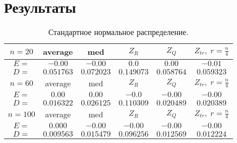 \documentclass[a4]{article}
\begin{document}
\newpage
\section{Результаты}

\begin{table}[H]
\caption{\label{tab:normal} Стандартное нормальное распределение.}
\begin{center}
\begin{tabular}{|c|c|c|c|c|c|}
\hline
$n = 20$ & average & med & $Z_R$ & $Z_Q$ & $Z_{tr},\;r=\frac{n}{4}$\\
\hline
$E =$ & $-0.00$ & $-0.00$ & $0.0$ & $0.00$ & $-0.01$\\
\hline
$D =$ & $0.051763$ & $0.072023$ & $0.149073$ & $0.058764$ & $0.059323$\\
\hline
$n = 60$ & average & med & $Z_R$ & $Z_Q$ & $Z_{tr},\;r=\frac{n}{4}$\\
\hline
$E =$ & $0.00$ & $0.00$ & $-0.0$ & $-0.00$ & $-0.00$\\
\hline
$D =$ & $0.016322$ & $0.026125$ & $0.110309$ & $0.020489$ & $0.020389$\\
\hline
$n = 100$ & average & med & $Z_R$ & $Z_Q$ & $Z_{tr},\;r=\frac{n}{4}$\\
\hline
$E =$ & $0.000$ & $-0.00$ & $-0.00$ & $-0.00$ & $-0.00$\\
\hline
$D =$ & $0.009563$ & $0.015479$ & $0.096256$ & $0.012569$ & $0.012224$\\
\hline
\end{tabular}
\end{center}
\end{table}
\end{document}
